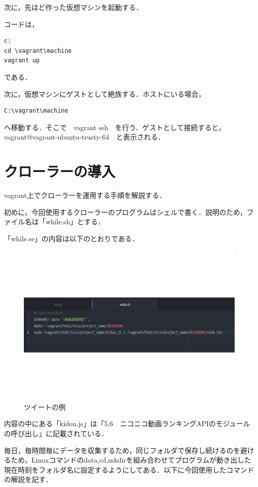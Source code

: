 次に，先ほど作った仮想マシンを起動する．

コードは，
	\begin{verbatim}
c:
cd \vagrant\machine
vagrant up
	\end{verbatim}
である．

次に，仮想マシンにゲストとして絶族する．ホストにいる場合，\begin{verbatim}C:\vagrant\machine　\end{verbatim}へ移動する．そこで　vagrant ssh　を行う．ゲストとして接続すると，vagrant@vagrant-ubuntu-trusty-64　と表示される．

\section{クローラーの導入}
vagrant上でクローラーを運用する手順を解説する．

初めに，今回使用するクローラーのプログラムはシェルで書く．説明のため，ファイル名は「while.sh」とする．

「while.se」の内容は以下のとおりである．

\begin{figure}[htb]
\centering
\includegraphics[width=16cm]{while.pdf}
\caption{ツイートの例}\label{ace}
\end{figure}


内容の中にある「kidou.js」は「5,6　ニコニコ動画ランキングAPIのモジュールの呼び出し」に記載されている．

毎日，毎時間毎にデータを収集するため，同じフォルダで保存し続けるのを避けるため，Linuxコマンドのdata,cd,mkdirを組み合わせてプログラムが動き出した現在時刻をフォルダ名に設定するようにしてある．以下に今回使用したコマンドの解説を記す．

